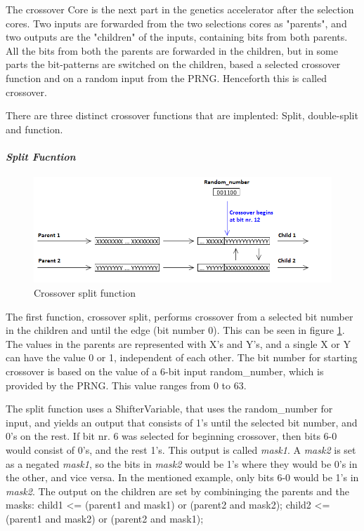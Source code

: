 The crossover Core is the next part in the genetics accelerator after the selection cores. Two inputs are forwarded from the two selections cores as "parents", and two outputs are the "children" of the inputs, containing bits from both parents. All the bits from both the parents are forwarded in the children, but in some parts the bit-patterns are switched on the children, based a selected crossover function and on a random input from the PRNG. Henceforth this is called crossover.

There are three distinct crossover functions that are implented: Split, double-split and function.


\paragraph{\textit{Split Fucntion}}
\begin{figure}[H]
\includegraphics[width=\textwidth]{fpga/fig/crossover_split.png}
\caption{Crossover split function}
\label{fig_crossover_split}
\end{figure}

The first function, crossover split, performs crossover from a selected bit number in the children and until the edge (bit number 0). This can be seen in figure \ref{fig_crossover_split}. The values in the parents are represented with X's and Y's, and a single X or Y can have the value 0 or 1, independent of each other.
The bit number for starting crossover is based on the value of a 6-bit input random\_number, which is provided by the PRNG. This value ranges from 0 to 63.

The split function uses a ShifterVariable, that uses the random\_number for input, and yields an output that consists of 1's until the selected bit number, and 0's on the rest. If bit nr. 6 was selected for beginning crossover, then bits 6-0 would consist of 0's, and the rest 1's. This output is called \emph{mask1}. A \emph{mask2} is set as a negated \emph{mask1}, so the bits in \emph{mask2} would be 1's where they would be 0's in the other, and vice versa. In the mentioned example, only bits 6-0 would be 1's in \emph{mask2}. The output on the children are set by combininging the parents and the masks:
child1 <= (parent1 and mask1) or (parent2 and mask2);
child2 <= (parent1 and mask2) or (parent2 and mask1);

